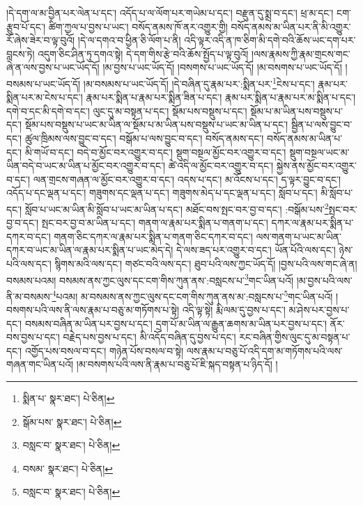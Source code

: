 །དེ་དག་ལ་མ་བྱིན་པར་ལེན་པ་དང་། འདོད་པ་ལ་ལོག་པར་གཡེམ་པ་དང་། བརྫུན་དུ་སྨྲ་བ་དང་། ཕྲ་མ་དང་། ངག་རྩུབ་པོ་དང་། ཚིག་ཀྱལ་པ་བྱས་པ་ཡང་། བསོད་ནམས་ཁོ་ནར་འགྱུར་གྱི། བསོད་ནམས་མ་ཡིན་པར་ནི་མི་འགྱུར་རོ་ཞེས་ཟེར་བ་ལྟ་བུའོ། །དེ་ལ་དགའ་བ་ཕྱིན་ཅི་ལོག་པ་ནི། འདི་ལྟར་འདི་ན་ཁ་ཅིག་མི་དགེ་བའི་ཆོས་ཡང་དག་པར་བླངས་ཏེ། འདུག་ཅིང་ཤིན་ཏུ་དགའ་སྟེ། དེ་དག་གིས་རྩེ་བའི་ཆོས་སྤྱོད་པ་ལྟ་བུའོ། །ལས་རྣམས་ཀྱི་རྣམ་གྲངས་གང་ཞེ་ན་ལས་བྱས་པ་ཡང་ཡོད་དོ། །མ་བྱས་པ་ཡང་ཡོད་དོ། །བསགས་པ་ཡང་ཡོད་དོ། །མ་བསགས་པ་ཡང་ཡོད་དོ། །བསམས་པ་ཡང་ཡོད་དོ། །མ་བསམས་པ་ཡང་ཡོད་དོ། །དེ་བཞིན་དུ་རྣམ་པར་:སྨིན་པར་\footnote{སྨིན་པ་  སྣར་ཐང་།  པེ་ཅིན། }ངེས་པ་དང་། རྣམ་པར་སྨིན་པར་མ་ངེས་པ་དང་། རྣམ་པར་སྨིན་པ་རྣམ་པར་སྨིན་ཟིན་པ་དང་། རྣམ་པར་སྨིན་པ་རྣམ་པར་མ་སྨིན་པ་དང་། དགེ་བ་དང་མི་དགེ་བ་དང་། ལུང་དུ་མ་བསྟན་པ་དང་། སྡོམ་པས་བསྡུས་པ་དང་། སྡོམ་པ་མ་ཡིན་པས་བསྡུས་པ་དང་། སྡོམ་པས་བསྡུས་པ་ཡང་མ་ཡིན་ལ་སྡོམ་པ་མ་ཡིན་པས་བསྡུས་པ་ཡང་མ་ཡིན་པ་དང་། སྦྱིན་པ་ལས་བྱུང་བ་དང་། ཚུལ་ཁྲིམས་ལས་བྱུང་བ་དང་། བསྒོམ་པ་ལས་བྱུང་བ་དང་། བསོད་ནམས་དང་། བསོད་ནམས་མ་ཡིན་པ་དང་། མི་གཡོ་བ་དང་། བདེ་བ་མྱོང་བར་འགྱུར་བ་དང་། སྡུག་བསྔལ་མྱོང་བར་འགྱུར་བ་དང་། སྡུག་བསྔལ་ཡང་མ་ཡིན་བདེ་བ་ཡང་མ་ཡིན་པ་མྱོང་བར་འགྱུར་བ་དང་། ཚེ་འདི་ལ་མྱོང་བར་འགྱུར་བ་དང་། སྐྱེས་ནས་མྱོང་བར་འགྱུར་བ་དང་། ལན་གྲངས་གཞན་ལ་མྱོང་བར་འགྱུར་བ་དང་། འདས་པ་དང་། མ་འོངས་པ་དང་། ད་ལྟར་བྱུང་བ་དང་། འདོད་པ་དང་ལྡན་པ་དང་། གཟུགས་དང་ལྡན་པ་དང་། གཟུགས་མེད་པ་དང་ལྡན་པ་དང་། སློབ་པ་དང་། མི་སློབ་པ་དང་། སློབ་པ་ཡང་མ་ཡིན་མི་སློབ་པ་ཡང་མ་ཡིན་པ་དང་། མཐོང་བས་སྤང་བར་བྱ་བ་དང་། :བསྒོམ་པས་\footnote{སྒོམ་པས་  སྣར་ཐང་།  པེ་ཅིན། }སྤང་བར་བྱ་བ་དང་། སྤང་བར་བྱ་བ་མ་ཡིན་པ་དང་། གནག་ལ་རྣམ་པར་སྨིན་པ་གནག་པ་དང་། དཀར་ལ་རྣམ་པར་སྨིན་པ་དཀར་བ་དང་། གནག་ཅིང་དཀར་ལ་རྣམ་པར་སྨིན་པ་གནག་ཅིང་དཀར་བ་དང་། ལས་གནག་པ་ཡང་མ་ཡིན་དཀར་བ་ཡང་མ་ཡིན་ལ་རྣམ་པར་སྨིན་པ་ཡང་མེད་དེ། དེ་ལས་ཟད་པར་འགྱུར་བ་དང་། ཡོན་པོའི་ལས་དང་། ཉེས་པའི་ལས་དང་། སྙིགས་མའི་ལས་དང་། གཙང་བའི་ལས་དང་། ཐུབ་པའི་ལས་ཀྱང་ཡོད་དོ། །བྱས་པའི་ལས་གང་ཞེ་ན། བསམས་པའམ། བསམས་ནས་ཀྱང་ལུས་དང་ངག་གིས་ཀུན་ནས་:བསླངས་པ་\footnote{བསླང་བ་  སྣར་ཐང་།  པེ་ཅིན། }གང་ཡིན་པའོ། །མ་བྱས་པའི་ལས་ནི་མ་བསམས་\footnote{བསམ་  སྣར་ཐང་།  པེ་ཅིན། }པའམ། མ་བསམས་ནས་ཀྱང་ལུས་དང་ངག་གིས་ཀུན་ནས་མ་:བསླངས་པ་\footnote{བསླང་བ་  སྣར་ཐང་།  པེ་ཅིན། }གང་ཡིན་པའོ། །བསགས་པའི་ལས་ནི་ལས་རྣམ་པ་བཅུ་མ་གཏོགས་པ་སྟེ། འདི་ལྟ་སྟེ། རྨི་ལམ་དུ་བྱས་པ་དང་། མ་ཤེས་པར་བྱས་པ་དང་། བསམས་བཞིན་མ་ཡིན་པར་བྱས་པ་དང་། དྲག་པོ་མ་ཡིན་ལ་རྒྱུན་ཆགས་མ་ཡིན་པར་བྱས་པ་དང་། ནོར་བས་བྱས་པ་དང་། བརྗེད་པས་བྱས་པ་དང་། མི་འདོད་བཞིན་དུ་བྱས་པ་དང་། རང་བཞིན་གྱིས་ལུང་དུ་མ་བསྟན་པ་དང་། འགྱོད་པས་བསལ་བ་དང་། གཉེན་པོས་བསལ་བ་སྟེ། ལས་རྣམ་པ་བཅུ་པོ་འདི་དག་མ་གཏོགས་པའི་ལས་གཞན་གང་ཡིན་པའོ། །མ་བསགས་པའི་ལས་ནི་རྣམ་པ་བཅུ་པོ་ཇི་སྐད་བསྟན་པ་ཉིད་དོ། །

